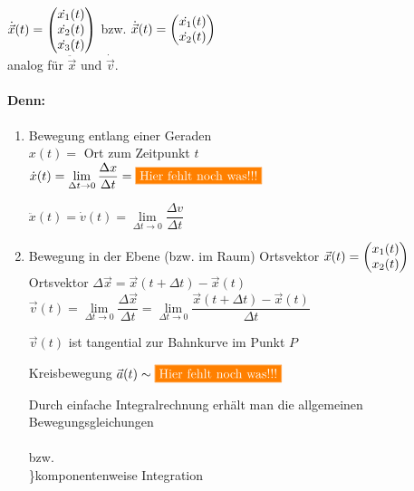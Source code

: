 $\dot{\vec{x}}(t)=\begin{pmatrix}\dot{x_1}(t)\\\dot{x_2}(t)\\\dot{x_3}(t)\end{pmatrix}$ bzw. $\dot{\vec{x}}(t)=\begin{pmatrix}\dot{x_1}(t)\\\dot{x_2}(t)\end{pmatrix}$\\
analog für $\ddot{\vec{x}}$ und $\dot{\vec{v}}$.

\paragraph{Denn:}\quad
\begin{enumerate}
	\item Bewegung entlang einer Geraden\\
	$x(t)=$ Ort zum Zeitpunkt $t$\\
	$\dot{x}(t)=\lim\limits_{\Delta t\to0}\dfrac{\Delta x}{\Delta t}=\placeholder$
	
	\imgplaceholder
	$\ddot{x}(t)=\dot{v}(t)=\lim\limits_{\Delta t\to0}\dfrac{\Delta v}{\Delta t}$
	
	\item Bewegung in der Ebene (bzw. im Raum)
	\imgplaceholder
	Ortsvektor $\vec{x}(t)=\begin{pmatrix}x_1(t)\\x_2(t)\end{pmatrix}$
	\imgplaceholder
	Ortsvektor $\Delta\vec{x}=\vec{x}(t+\Delta t)-\vec{x}(t)$
	\imgplaceholder
	$\vec{v}(t)=\lim\limits_{\Delta t\to0}\dfrac{\Delta\vec{x}}{\Delta t}=\lim\limits_{\Delta t\to0}\dfrac{\vec{x}(t+\Delta t)-\vec{x}(t)}{\Delta t}$
	
	$\vec{v}(t)$ ist tangential zur Bahnkurve im Punkt $P$
	
	\Bsp Kreisbewegung
	\imgplaceholder
	$\vec{a}(t)\sim\placeholder$
	
	Durch einfache Integralrechnung erhält man die allgemeinen Bewegungsgleichungen\\
	\hhspace{2cm}\\
	bzw.\\
	\hhspace{2cm}\}komponentenweise Integration
	
	\Bsp \placeholder
\end{enumerate}

\placeholder


